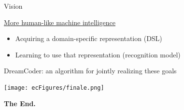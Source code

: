 \documentclass{beamer}
\begin{document}
\begin{frame}{Vision}


   \underline{More human-like machine intelligence}\\%
   \begin{itemize}
   \item    Acquiring a domain-specific representation (DSL)
     \item Learning  to use that representation (recognition model)
   \end{itemize}
   DreamCoder: an algorithm for jointly realizing these goals

   



   \hspace{-1cm}\texttt{[image: ecFigures/finale.png]}

   \pause

   \Huge \centering \textbf{The End.}
  \end{frame}
\end{document}
